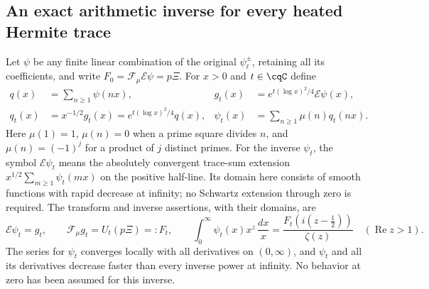 \subsection{An exact arithmetic inverse for every heated Hermite trace}
\label{sec:cq-moebius}
Let $\psi$ be any finite linear combination of the original
$\psi_\ell^\pm$, retaining all its coefficients, and write
$F_0=\mathcal F_\mu\mathcal E\psi=p\Xi$. For $x>0$ and
$t\in\cqC$ define
\begin{equation}\label{eq:cq-moebius-data}
 \begin{aligned}
 q(x)&=\sum_{n\geq1}\psi(nx),&
 g_t(x)&=e^{t(\log x)^2/4}\mathcal E\psi(x),\\
 q_t(x)&=x^{-1/2}g_t(x)=e^{t(\log x)^2/4}q(x),&
 \psi_t(x)&=\sum_{n\geq1}\mu(n)q_t(nx).
 \end{aligned}
\end{equation}
Here $\mu(1)=1$, $\mu(n)=0$ when a prime square divides $n$,
and $\mu(n)=(-1)^j$ for a product of $j$ distinct primes.
For the inverse $\psi_t$, the symbol $\mathcal E\psi_t$ means
the absolutely convergent trace-sum extension
$x^{1/2}\sum_{m\geq1}\psi_t(mx)$ on the positive half-line.
Its domain here consists of smooth functions with rapid decrease
at infinity; no Schwartz extension through zero is required.
The transform and inverse assertions, with their domains, are
\begin{equation}\label{eq:cq-moebius-inverse}
 \mathcal E\psi_t=g_t,\qquad
 \mathcal F_\mu g_t=U_t(p\Xi)=:F_t,\qquad
 \int_0^\infty\psi_t(x)x^z\,\frac{dx}{x}
       =\frac{F_t(i(z-\tfrac12))}{\zeta(z)}
       \quad(\operatorname{Re}z>1).
\end{equation}
The series for $\psi_t$ converges locally with all derivatives on
$(0,\infty)$, and $\psi_t$ and all its derivatives decrease faster
than every inverse power at infinity. No behavior at zero has been
assumed for this inverse.

